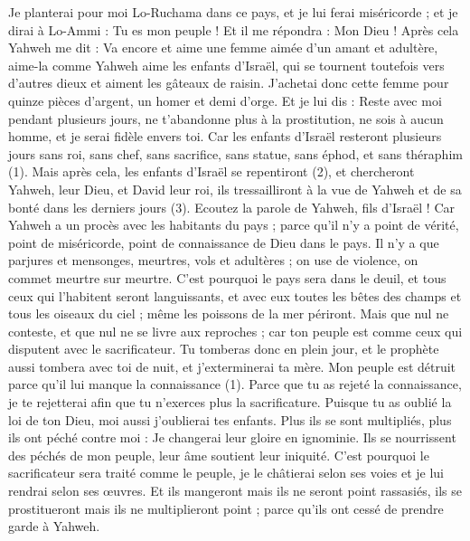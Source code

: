\begin{multicols}{2}
Je planterai pour moi Lo-Ruchama dans ce pays, et je lui ferai miséricorde ; et je dirai à Lo-Ammi : Tu es mon peuple ! Et il me répondra : Mon Dieu !
\VerseOne{}Après cela Yahweh me dit : Va encore et aime une femme aimée d'un amant et adultère, aime-la comme Yahweh aime les enfants d'Israël, qui se tournent toutefois vers d'autres dieux et aiment les gâteaux de raisin.
J’achetai donc cette femme pour quinze pièces d'argent, un homer et demi d'orge.
Et je lui dis : Reste avec moi pendant plusieurs jours, ne t'abandonne plus à la prostitution, ne sois à aucun homme, et je serai fidèle envers toi.
Car les enfants d'Israël resteront plusieurs jours sans roi, sans chef, sans sacrifice, sans statue, sans éphod, et sans théraphim (1).
Mais après cela, les enfants d'Israël se repentiront (2), et chercheront Yahweh, leur Dieu, et David leur roi, ils tressailliront à la vue de Yahweh et de sa bonté dans les derniers jours (3).
\VerseOne{}Ecoutez la parole de Yahweh, fils d'Israël ! Car Yahweh a un procès avec les habitants du pays ; parce qu'il n'y a point de vérité, point de miséricorde, point de connaissance de Dieu dans le pays.
Il n'y a que parjures et mensonges, meurtres, vols et adultères ; on use de violence, on commet meurtre sur meurtre.
C'est pourquoi le pays sera dans le deuil, et tous ceux qui l’habitent seront languissants, et avec eux toutes les bêtes des champs et tous les oiseaux du ciel ; même les poissons de la mer périront.
Mais que nul ne conteste, et que nul ne se livre aux reproches ; car ton peuple est comme ceux qui disputent avec le sacrificateur.
Tu tomberas donc en plein jour, et le prophète aussi tombera avec toi de nuit, et j'exterminerai ta mère.
Mon peuple est détruit parce qu’il lui manque la connaissance (1). Parce que tu as rejeté la connaissance, je te rejetterai afin que tu n'exerces plus la sacrificature. Puisque tu as oublié la loi de ton Dieu, moi aussi j'oublierai tes enfants.
Plus ils se sont multipliés, plus ils ont péché contre moi : Je changerai leur gloire en ignominie.
Ils se nourrissent des péchés de mon peuple, leur âme soutient leur iniquité.
C'est pourquoi le sacrificateur sera traité comme le peuple, je le châtierai selon ses voies et je lui rendrai selon ses œuvres.
Et ils mangeront mais ils ne seront point rassasiés, ils se prostitueront mais ils ne multiplieront point ; parce qu'ils ont cessé de prendre garde à Yahweh.

\end{multicols}
